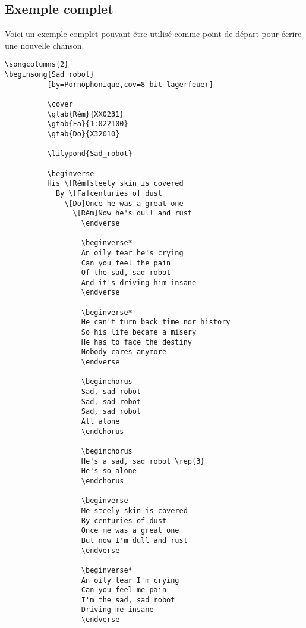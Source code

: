 \documentclass[versionenligne]{patacrep}
\begin{document}
\subsection{Exemple complet}

Voici un exemple complet pouvant être utilisé comme point de départ
pour écrire une nouvelle chanson.

\begin{verbatim}
\songcolumns{2}
\beginsong{Sad robot}
          [by=Pornophonique,cov=8-bit-lagerfeuer]

          \cover
          \gtab{Rém}{XX0231}
          \gtab{Fa}{1:022100}
          \gtab{Do}{X32010}

          \lilypond{Sad_robot}

          \beginverse
          His \[Rém]steely skin is covered
            By \[Fa]centuries of dust
              \[Do]Once he was a great one
                \[Rém]Now he's dull and rust
                  \endverse

                  \beginverse*
                  An oily tear he's crying
                  Can you feel the pain
                  Of the sad, sad robot
                  And it's driving him insane
                  \endverse

                  \beginverse*
                  He can't turn back time nor history
                  So his life became a misery
                  He has to face the destiny
                  Nobody cares anymore
                  \endverse

                  \beginchorus
                  Sad, sad robot
                  Sad, sad robot
                  Sad, sad robot
                  All alone
                  \endchorus

                  \beginchorus
                  He's a sad, sad robot \rep{3}
                  He's so alone
                  \endchorus

                  \beginverse
                  Me steely skin is covered
                  By centuries of dust
                  Once me was a great one
                  But now I'm dull and rust
                  \endverse

                  \beginverse*
                  An oily tear I'm crying
                  Can you feel me pain
                  I'm the sad, sad robot
                  Driving me insane
                  \endverse


\end{verbatim}
\end{document}
